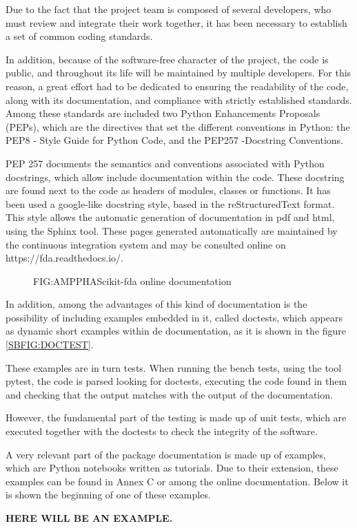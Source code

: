 Due to the fact that the project team is composed of several developers, who
must review and integrate their work together, it has been necessary to
establish a set of common coding standards.

In addition, because of the software-free character of the project, the code is
public, and throughout its life will be maintained by multiple developers. For
this reason, a great effort had to be dedicated to ensuring the readability of
the code, along with its documentation, and compliance with strictly established
standards. Among these standards are included two Python Enhancements Proposals
(PEPs), which are the directives that set the different conventions in Python:
the PEP8 - Style Guide for Python Code, and the PEP257 -Docstring Conventions.

PEP 257 documents the semantics and conventions associated with Python
docstrings, which allow include documentation within the code. These docstring
are found next to the code as headers of modules, classes or functions. It has
been used a google-like docstring style, based in the reStructuredText format.
This style allows the automatic generation of documentation in pdf and html,
using the Sphinx tool. These pages generated automatically are maintained by
the continuous integration system and may be consulted online on
https://fda.readthedocs.io/.

\begin{figure}[Scikit-fda online documentation]{FIG:AMPPHA}{Scikit-fda online documentation}
   \quad
\end{figure}

In addition, among the advantages of this kind of documentation is the
possibility of including examples embedded in it, called doctests, which appears
 as dynamic short examples within de documentation, as it is shown in the
 figure \ref{SBFIG:DOCTEST}.

These examples are in turn tests. When running the bench tests, using the tool
pytest, the code is parsed looking for doctests, executing the code found in
them and checking that the output matches with the output of the documentation.

However, the fundamental part of the testing is made up of unit tests, which are
executed together with the doctests to check the integrity of the software.

A very relevant part of the package documentation is made up of examples,
which are Python notebooks written as tutorials. Due to their extension, these
examples can be found in Annex C or among the online documentation. Below it is
shown the beginning of one of these examples.

\textbf{HERE WILL BE AN EXAMPLE.}
